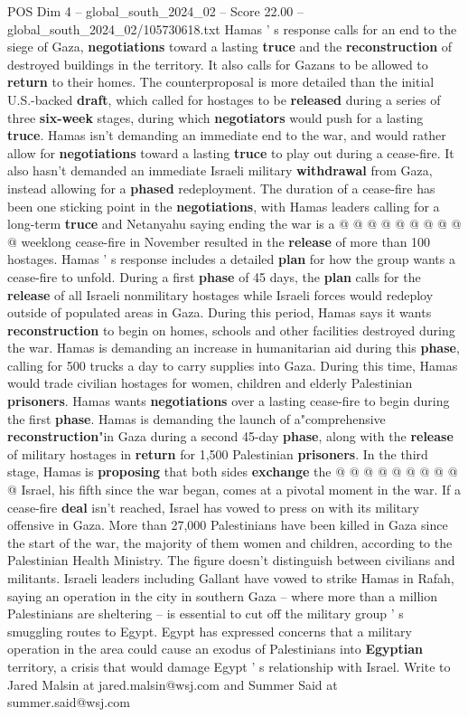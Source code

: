 \begin{textsample}{POS Dim 4 – global\_south\_2024\_02 – Score 22.00 – global\_south\_2024\_02/105730618.txt}
Hamas ' s response calls for an end to the siege of Gaza, \textbf{negotiations} toward a lasting \textbf{truce} and the \textbf{reconstruction} of destroyed buildings in the territory.
It also calls for Gazans to be allowed to \textbf{return} to their homes.
The counterproposal is more detailed than the initial U.S.-backed \textbf{draft}, which called for hostages to be \textbf{released} during a series of three \textbf{six-week} stages, during which \textbf{negotiators} would push for a lasting \textbf{truce}.
Hamas isn't demanding an immediate end to the war, and would rather allow for \textbf{negotiations} toward a lasting \textbf{truce} to play out during a cease-fire.
It also hasn't demanded an immediate Israeli military \textbf{withdrawal} from Gaza, instead allowing for a \textbf{phased} redeployment.
The duration of a cease-fire has been one sticking point in the \textbf{negotiations}, with Hamas leaders calling for a long-term \textbf{truce} and Netanyahu saying ending the war is a @ @ @ @ @ @ @ @ @ @ weeklong cease-fire in November resulted in the \textbf{release} of more than 100 hostages.
Hamas ' s response includes a detailed \textbf{plan} for how the group wants a cease-fire to unfold.
During a first \textbf{phase} of 45 days, the \textbf{plan} calls for the \textbf{release} of all Israeli nonmilitary hostages while Israeli forces would redeploy outside of populated areas in Gaza.
During this period, Hamas says it wants \textbf{reconstruction} to begin on homes, schools and other facilities destroyed during the war.
Hamas is demanding an increase in humanitarian aid during this \textbf{phase}, calling for 500 trucks a day to carry supplies into Gaza.
During this time, Hamas would trade civilian hostages for women, children and elderly Palestinian \textbf{prisoners}.
Hamas wants \textbf{negotiations} over a lasting cease-fire to begin during the first \textbf{phase}.
Hamas is demanding the launch of a"comprehensive \textbf{reconstruction}"in Gaza during a second 45-day \textbf{phase}, along with the \textbf{release} of military hostages in \textbf{return} for 1,500 Palestinian \textbf{prisoners}.
In the third stage, Hamas is \textbf{proposing} that both sides \textbf{exchange} the @ @ @ @ @ @ @ @ @ @ Israel, his fifth since the war began, comes at a pivotal moment in the war.
If a cease-fire \textbf{deal} isn't reached, Israel has vowed to press on with its military offensive in Gaza.
More than 27,000 Palestinians have been killed in Gaza since the start of the war, the majority of them women and children, according to the Palestinian Health Ministry.
The figure doesn't distinguish between civilians and militants.
Israeli leaders including Gallant have vowed to strike Hamas in Rafah, saying an operation in the city in southern Gaza -- where more than a million Palestinians are sheltering -- is essential to cut off the military group ' s smuggling routes to Egypt.
Egypt has expressed concerns that a military operation in the area could cause an exodus of Palestinians into \textbf{Egyptian} territory, a crisis that would damage Egypt ' s relationship with Israel.
Write to Jared Malsin at jared.malsin@wsj.com and Summer Said at summer.said@wsj.com


\end{textsample}
